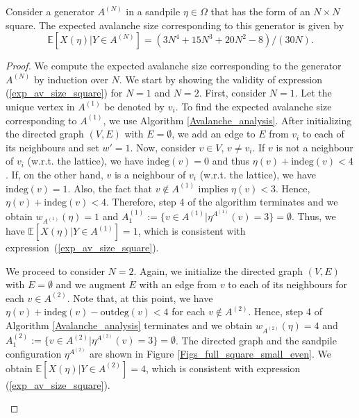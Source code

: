 \documentclass{article}
\begin{document}
\begin{theorem}\label{thm_exp_av_size_square}
Consider a generator $A^{(N)}$ in a sandpile $\eta \in \Omega$ that has the form of an $N\times N$ square. The expected avalanche size corresponding to this generator is given by
\begin{equation}\label{exp_av_size_square}
\mathbb{E}[X(\eta)|Y \in A^{(N)}] = (3N^4+15N^3+20N^2-8)/(30N). 
\end{equation}
\end{theorem}
\begin{proof}
    We compute the expected avalanche size corresponding to the generator $A^{(N)}$ by induction over $N$. We start by showing the validity of expression (\ref{exp_av_size_square}) for $N = 1$ and $N = 2$. First, consider $N = 1$. Let the unique vertex in $A^{(1)}$ be denoted by $v_i$. To find the expected avalanche size corresponding to $A^{(1)}$, we use Algorithm \ref{Avalanche_analysis}. After initializing the directed graph $(V, E)$ with $E = \emptyset$, we add an edge to $E$ from $v_i$ to each of its neighbours and set $w' = 1$. Now, consider $v \in V$, $v \neq v_i$. If $v$ is not a neighbour of $v_i$ (w.r.t. the lattice), we have $\text{indeg}(v) = 0$ and thus $\eta(v) + \text{indeg}(v) < 4$. If, on the other hand, $v$ is a neighbour of $v_i$ (w.r.t. the lattice), we have $\text{indeg}(v) = 1$. Also, the fact that $v \notin A^{(1)}$ implies $\eta(v) < 3$. Hence, $\eta(v) + \text{indeg}(v) < 4$. Therefore, step 4 of the algorithm terminates and we obtain $w_{A^{(1)}}(\eta) = 1$ and $A^{(1)}_1 := \{v \in A^{(1)}|\eta^{A^{(1)}}(v) = 3\} = \emptyset$. Thus, we have $\mathbb{E}[X(\eta)|Y \in A^{(1)}] = 1$, which is consistent with expression~(\ref{exp_av_size_square}). 
    
    We proceed to consider $N = 2$. Again, we initialize the directed graph $(V, E)$ with $E = \emptyset$ and we augment $E$ with an edge from $v$ to each of its neighbours for each $v \in A^{(2)}$. Note that, at this point, we have $\eta(v) + \text{indeg}(v) - \text{outdeg}(v) < 4$ for each $v \notin A^{(2)}$. Hence, step 4 of Algorithm \ref{Avalanche_analysis} terminates and we obtain $w_{A^{(2)}}(\eta) = 4$ and $A^{(2)}_1 := \{v \in A^{(2)}|\eta^{A^{(2)}}(v) = 3\} = \emptyset$. The directed graph and the sandpile configuration $\eta^{A^{(2)}}$ are shown in Figure \ref{Figs_full_square_small_even}. We obtain $\mathbb{E}[X(\eta)|Y \in A^{(2)}] = 4$, which is consistent with expression (\ref{exp_av_size_square}). 

     \begin{figure}[H]
    \centering
    \captionsetup[subfigure]{justification=centering, labelformat=empty, singlelinecheck=false, width=0.6\linewidth}


\end{figure}
\end{proof}
\end{document}
